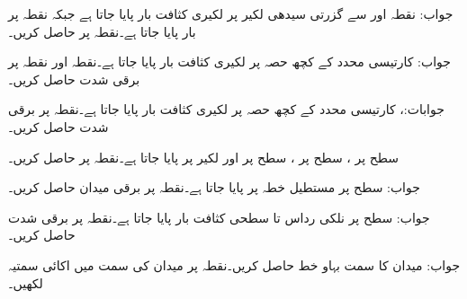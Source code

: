  

جواب:
نقطہ  اور  سے گزرتی سیدھی لکیر پر لکیری کثافت بار  پایا جاتا ہے جبکہ نقطہ  پر  بار پایا جاتا ہے۔نقطہ  پر  حاصل کریں۔

جواب:
کارتیسی  محدد کے کچھ حصہ  پر لکیری کثافت بار  پایا جاتا ہے۔نقطہ   اور نقطہ   پر برقی شدت  حاصل کریں۔

جوابات:، 
کارتیسی  محدد کے کچھ حصہ  پر لکیری کثافت بار  پایا جاتا
 ہے۔نقطہ  پر برقی شدت  حاصل کریں۔

سطح  پر ، سطح  پر ، سطح  پر  اور لکیر  پر
  پایا جاتا ہے۔نقطہ  پر  حاصل کریں۔

جواب:
سطح  پر مستطیل خطہ   پر  پایا جاتا ہے۔نقطہ  پر برقی میدان  حاصل کریں۔

جواب:
سطح  پر نلکی رداس  تا  سطحی کثافت بار  پایا جاتا ہے۔نقطہ  پر برقی شدت  حاصل کریں۔

جواب:
میدان  کا سمت بہاو خط حاصل کریں۔نقطہ  پر میدان کی سمت میں اکائی سمتیہ لکھیں۔

